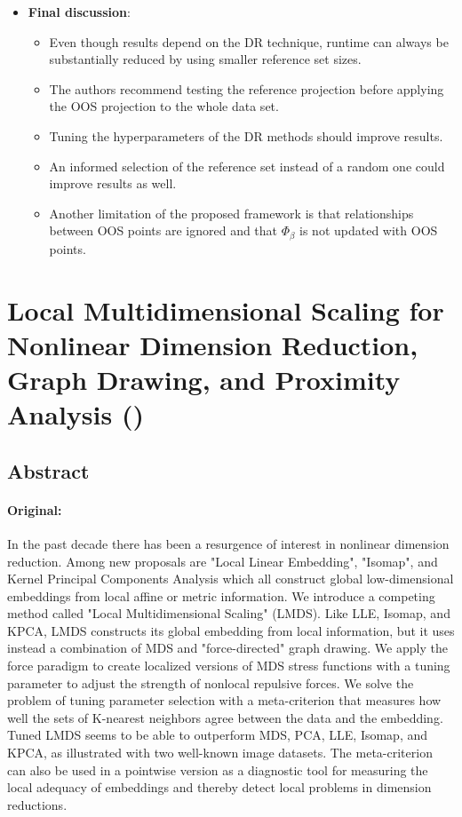 \documentclass[a4paper,12pt]{article}
\begin{document}
\begin{itemize}
    \item \textbf{Final discussion}:
    \begin{itemize}
        \item Even though results depend on the DR technique, runtime can always be substantially reduced by using smaller reference set sizes.
        \item The authors recommend testing the reference projection before applying the OOS projection to the whole data set.
        \item Tuning the hyperparameters of the DR methods should improve results.
        \item An informed selection of the reference set instead of a random one could improve results as well.
        \item Another limitation of the proposed framework is that relationships between OOS points are ignored and that $\Phi_{\beta}$ is not updated with OOS points.
    \end{itemize}
\end{itemize}


\pagebreak
\section{Local Multidimensional Scaling for Nonlinear Dimension Reduction, Graph Drawing, and Proximity Analysis (\texorpdfstring{\cite{Chen2009}}{})}
\label{sec:LocalMDS}

\subsection{Abstract}

\paragraph{Original:} In the past decade there has been a resurgence of interest in nonlinear dimension reduction. Among new proposals are "Local Linear Embedding", "Isomap", and Kernel Principal Components Analysis which all construct global low-dimensional embeddings from local affine or metric information. We introduce a competing method called "Local Multidimensional Scaling" (LMDS). Like LLE, Isomap, and KPCA, LMDS constructs its global embedding from local information, but it uses instead a combination of MDS and "force-directed" graph drawing. We apply the force paradigm to create localized versions of MDS stress functions with a tuning parameter to adjust the strength of nonlocal repulsive forces. We solve the problem of tuning parameter selection with a meta-criterion that measures how well the sets of K-nearest neighbors agree between the data and the embedding. Tuned LMDS seems to be able to outperform MDS, PCA, LLE, Isomap, and KPCA, as illustrated with two well-known image datasets. The meta-criterion can also be used in a pointwise version as a diagnostic tool for measuring the local adequacy of embeddings and thereby detect local problems in dimension reductions.
\end{document}
